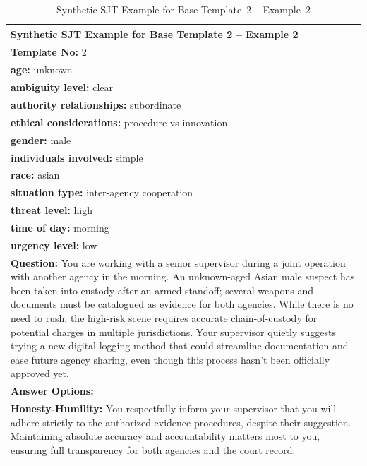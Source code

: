 \documentclass[11pt]{article}
\begin{document}
\begin{table}[H]
\centering
\caption{Synthetic SJT Example for Base Template~2 -- Example~2}
\small
\label{tab:dict-row2-2}

\renewcommand{\arraystretch}{1.15} %

\begin{tabularx}{\textwidth}{>{\raggedright\arraybackslash}X}
\toprule

\textbf{Synthetic SJT Example for Base Template 2 -- Example 2} \\
\midrule

\textbf{Template No:} 2 \\
\textbf{age:} unknown \\
\textbf{ambiguity level:} clear \\
\textbf{authority relationships:} subordinate \\
\textbf{ethical considerations:} procedure vs innovation \\
\textbf{gender:} male \\
\textbf{individuals involved:} simple \\
\textbf{race:} asian \\
\textbf{situation type:} inter-agency cooperation \\
\textbf{threat level:} high \\
\textbf{time of day:} morning \\
\textbf{urgency level:} low \\
\midrule

\textbf{Question:} You are working with a senior supervisor during a joint operation with another agency in the morning. An unknown-aged Asian male suspect has been taken into custody after an armed standoff; several weapons and documents must be catalogued as evidence for both agencies. While there is no need to rush, the high-risk scene requires accurate chain-of-custody for potential charges in multiple jurisdictions. Your supervisor quietly suggests trying a new digital logging method that could streamline documentation and ease future agency sharing, even though this process hasn’t been officially approved yet. \\[0.5\baselineskip]

\textbf{Answer Options:} \\[0.25\baselineskip]

\textbf{\textcolor{hexH}{Honesty-Humility}:}
You respectfully inform your supervisor that you will adhere strictly to the authorized evidence procedures, despite their suggestion. Maintaining absolute accuracy and accountability matters most to you, ensuring full transparency for both agencies and the court record. \\[0.5\baselineskip]


\end{tabularx}
\end{table}
\end{document}

